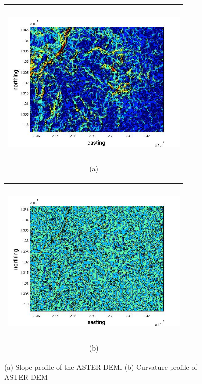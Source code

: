 \documentclass[a4paper,fleqn]{article}
\begin{document}
\begin{figure}[H]
    \begin{minipage}[b]{0.6\textwidth}
        \begin{tabular}{c}
        \includegraphics[width=9cm,height=8cm,keepaspectratio]{slope_profile_res.jpg}\\
        (a)
        \end{tabular}
    \end{minipage}
    \begin{minipage}{0.6\textwidth}
        \begin{tabular}{c}
        \includegraphics[width=9cm,height=8cm,keepaspectratio]{curvature_profile_res.jpg}\\
        (b)
        \end{tabular}
    \end{minipage} 
\caption{(a) Slope profile of the ASTER DEM. (b) Curvature profile of ASTER DEM}
\label{fig5}  
\end{figure}
\end{document}
